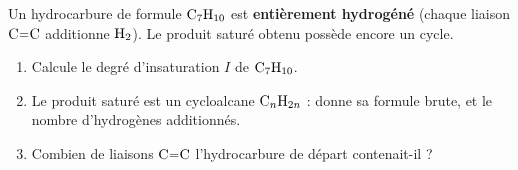 \documentclass[11pt,a4paper]{article}
\begin{document}
\begin{exo}
Un hydrocarbure de formule $\ce{C7H10}$ est \textbf{entièrement hydrogéné} (chaque liaison $\ce{C=C}$ additionne $\ce{H2}$). Le produit saturé obtenu possède encore un cycle.
\begin{enumerate}[label=\alph*)]
  \item Calcule le degré d'insaturation $I$ de $\ce{C7H10}$.
  \item Le produit saturé est un cycloalcane $\ce{C_nH_{2n}}$ : donne sa formule brute, et le nombre d'hydrogènes additionnés.
  \item Combien de liaisons $\ce{C=C}$ l'hydrocarbure de départ contenait-il ?
\end{enumerate}
\end{exo}
\end{document}
